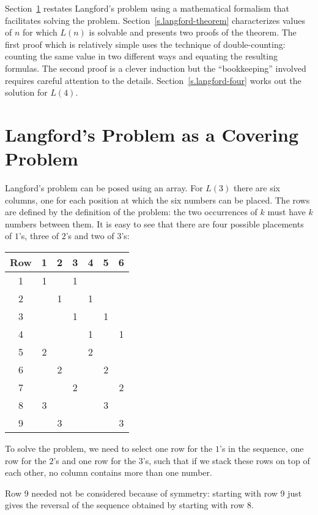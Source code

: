 \smallskip

Section~\ref{s.langford-covering} restates Langford's problem using a mathematical formalism that facilitates solving the problem. Section~\ref{s.langford-theorem} characterizes values of $n$ for which $L(n)$ is solvable and presents two proofs of the theorem. The first proof which is relatively simple uses the technique of double-counting: counting the same value in two different ways and equating the resulting formulas. The second proof is a clever induction but the ``bookkeeping'' involved requires careful attention to the details. Section~\ref{s.langford-four} works out the solution for $L(4)$.

\section{Langford's Problem as a Covering Problem}\label{s.langford-covering}
Langford's problem can be posed using an array. For $L(3)$ there are six columns, one for each position at which the six numbers can be placed. The rows are defined by the definition of the problem: the two occurrences of $k$ must have $k$ numbers between them. It is easy to see that there are four possible placements of $1$'s, three of $2$'s and two of $3$'s:

\begin{center}
\addtolength{\tabcolsep}{1mm}
\begin{tabular}{|c|c|c|c|c|c|c|}
\hline
Row&1&2&3&4&5&6\\\hline\hline
1&1&&1&&&\\\hline
2&&1&&1&&\\\hline
3&&&1&&1&\\\hline
4&&&&1&&1\\\hline
5&2&&&2&&\\\hline
6&&2&&&2&\\\hline
7&&&2&&&2\\\hline
8&3&&&&3&\\\hline
9&&3&&&&3\\\hline
\end{tabular}
\end{center}
To solve the problem, we need to select one row for the $1$'s in the sequence, one row for the $2$'s and one row for the $3$'s, such that if we stack these rows on top of each other, no column contains more than one number.

Row 9 needed not be considered because of symmetry: starting with row 9 just gives the reversal of the  sequence obtained by starting with row 8.

